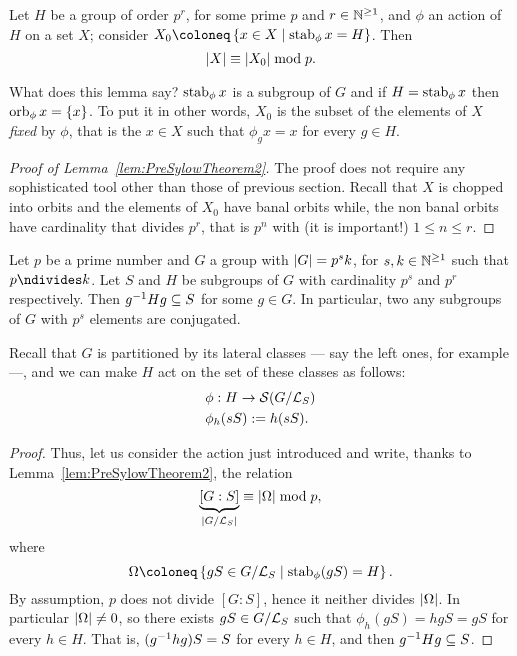 \begin{lemma}\label{lem:PreSylowTheorem2}
Let \(H\) be a group of order \(p^r\), for some prime \(p\) and \(r \in \mathbb N^{\ge 1}\), and \(\phi\) an action of \(H\) on a set \(X\); consider \(X_0 \coloneq \set{x \in X \mid \stab_\phi x = H}\). Then
\[\left\lvert X\right\rvert \equiv \left\lvert X_0\right\rvert \bmod p .\]
\end{lemma}

What does this lemma say? \(\operatorname{stab}_\phi x\) is a subgroup of \(G\) and if \(H = \operatorname{stab}_\phi x\) then \(\operatorname{orb}_{\phi} x = \left\{x\right\}\). To put it in other words, \(X_0\) is the subset of the elements of \(X\) {\em fixed} by \(\phi\), that is the \(x \in X\) such that \(\phi_g x = x\) for every \(g \in H\). 

\begin{proof}[Proof of Lemma~\ref{lem:PreSylowTheorem2}]
The proof does not require any sophisticated tool other than those of previous section. Recall that \(X\) is chopped into orbits and the elements of \(X_0\) have banal orbits while, the non banal orbits have cardinality that divides \(p^r\), that is \(p^n\) with (it is important!) \(1 \le n \le r\).
\end{proof}

\begin{proposition}\label{prop:SylowTheorem2}
Let \(p\) be a prime number and  \(G\) a group with \(\left\lvert G\right\rvert = p^s k\), for \(s, k \in \mathbb N^{\ge 1}\) such that \(p \ndivides k\). Let \(S\) and \(H\) be subgroups of \(G\) with cardinality \(p^s\) and \(p^r\) respectively. Then \(g^{-1} H g \subseteq S\) for some \(g \in G\). In particular, two any subgroups of \(G\) with \(p^s\) elements are conjugated.
\end{proposition}

Recall that \(G\) is partitioned by its lateral classes --- say the left ones, for example ---, and we can make \(H\) act on the set of these classes as follows:
\begin{align*}
& \phi : H \to \mathcal S(G/\mathcal L_S) \\
& \phi_h (sS) := h(sS) .
\end{align*}

\begin{proof} Thus, let us consider the action just introduced and write, thanks to Lemma~\ref{lem:PreSylowTheorem2}, the relation
\[\underbrace{[G:S]}_{\left\lvert G/\mathcal L_S\right\rvert} \equiv \left\lvert\Omega\right\rvert \bmod p ,\]
where
\[\Omega \coloneq \set{gS \in G/\call_S \mid \stab_\phi (gS) = H} .\]
By assumption, \(p\) does not divide \([G:S]\), hence it neither divides \(\left\lvert\Omega\right\rvert\). In particular \(\left\lvert\Omega\right\rvert \ne 0\), so there exists \(gS \in G/\mathcal L_S\) such that \(\phi_h(gS) = hgS = gS\) for every \(h \in H\). That is, \((g^{-1} h g) S = S\) for every \(h \in H\), and then \(g^{-1} H g \subseteq S\).
\end{proof}

